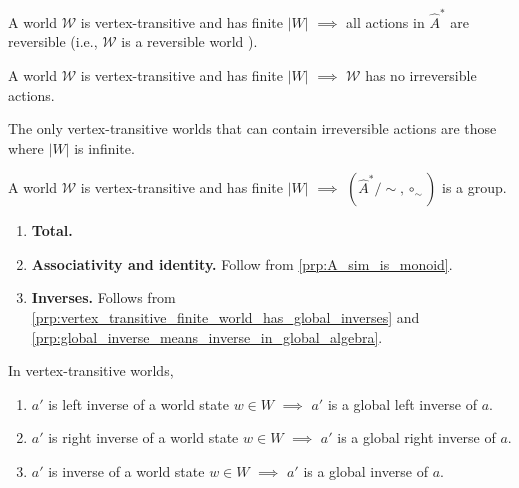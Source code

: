 \begin{corollary}
    A world $\mathscr{W}$ is vertex-transitive and has finite $|W|$ $\implies$ all actions in $\hat{A}^{*}$ are reversible (i.e., $\mathscr{W}$ is a reversible world ).
\end{corollary}

\begin{corollary}
    A world $\mathscr{W}$ is vertex-transitive and has finite $|W|$ $\implies$ $\mathscr{W}$ has no irreversible actions.
\end{corollary}

\begin{corollary}
    The only vertex-transitive worlds that can contain irreversible actions are those where $|W|$ is infinite.
\end{corollary}


\begin{propositionE}[][normal]
    A world $\mathscr{W}$ is vertex-transitive and has finite $|W|$ $\implies$ $(\hat{A}^{*}/\sim, \circ_{\sim})$ is a group.
    
\end{propositionE}
\begin{proofE}
\begin{enumerate}
    \item \textbf{Total.}

    \item \textbf{Associativity and identity.}
    Follow from \cref{prp:A_sim_is_monoid}.

    \item \textbf{Inverses.}
    Follows from \cref{prp:vertex_transitive_finite_world_has_global_inverses} and \cref{prp:global_inverse_means_inverse_in_global_algebra}.
\end{enumerate}
\end{proofE}


\begin{propositionE}[][normal]
    In vertex-transitive worlds,
    \begin{enumerate}
        \item $a'$ is left inverse of a world state $w \in W$ $\implies$ $a'$ is a global left inverse of $a$.
        \item $a'$ is right inverse of a world state $w \in W$ $\implies$ $a'$ is a global right inverse of $a$.
        \item $a'$ is inverse of a world state $w \in W$ $\implies$ $a'$ is a global inverse of $a$.
    \end{enumerate}
\end{propositionE}
\begin{proofE}
\end{proofE}

